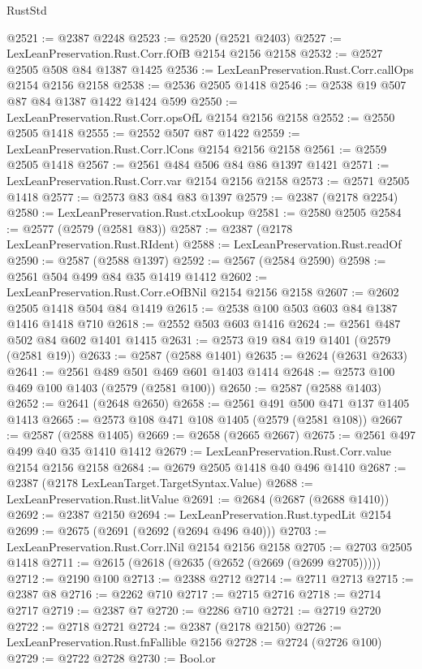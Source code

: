 \begin{lexlean}{RustStd}
\begin{coremodule}
@2521 := @2387 @2248
@2523 := @2520 (@2521 @2403)
@2527 := LexLeanPreservation.Rust.Corr.fOfB @2154 @2156 @2158
@2532 := @2527 @2505 @508 @84 @1387 @1425
@2536 := LexLeanPreservation.Rust.Corr.callOps @2154 @2156 @2158
@2538 := @2536 @2505 @1418
@2546 := @2538 @19 @507 @87 @84 @1387 @1422 @1424 @599
@2550 := LexLeanPreservation.Rust.Corr.opsOfL @2154 @2156 @2158
@2552 := @2550 @2505 @1418
@2555 := @2552 @507 @87 @1422
@2559 := LexLeanPreservation.Rust.Corr.lCons @2154 @2156 @2158
@2561 := @2559 @2505 @1418
@2567 := @2561 @484 @506 @84 @86 @1397 @1421
@2571 := LexLeanPreservation.Rust.Corr.var @2154 @2156 @2158
@2573 := @2571 @2505 @1418
@2577 := @2573 @83 @84 @83 @1397
@2579 := @2387 (@2178 @2254)
@2580 := LexLeanPreservation.Rust.ctxLookup
@2581 := @2580 @2505
@2584 := @2577 (@2579 (@2581 @83))
@2587 := @2387 (@2178 LexLeanPreservation.Rust.RIdent)
@2588 := LexLeanPreservation.Rust.readOf
@2590 := @2587 (@2588 @1397)
@2592 := @2567 (@2584 @2590)
@2598 := @2561 @504 @499 @84 @35 @1419 @1412
@2602 := LexLeanPreservation.Rust.Corr.eOfBNil @2154 @2156 @2158
@2607 := @2602 @2505 @1418 @504 @84 @1419
@2615 := @2538 @100 @503 @603 @84 @1387 @1416 @1418 @710
@2618 := @2552 @503 @603 @1416
@2624 := @2561 @487 @502 @84 @602 @1401 @1415
@2631 := @2573 @19 @84 @19 @1401 (@2579 (@2581 @19))
@2633 := @2587 (@2588 @1401)
@2635 := @2624 (@2631 @2633)
@2641 := @2561 @489 @501 @469 @601 @1403 @1414
@2648 := @2573 @100 @469 @100 @1403 (@2579 (@2581 @100))
@2650 := @2587 (@2588 @1403)
@2652 := @2641 (@2648 @2650)
@2658 := @2561 @491 @500 @471 @137 @1405 @1413
@2665 := @2573 @108 @471 @108 @1405 (@2579 (@2581 @108))
@2667 := @2587 (@2588 @1405)
@2669 := @2658 (@2665 @2667)
@2675 := @2561 @497 @499 @40 @35 @1410 @1412
@2679 := LexLeanPreservation.Rust.Corr.value @2154 @2156 @2158
@2684 := @2679 @2505 @1418 @40 @496 @1410
@2687 := @2387 (@2178 LexLeanTarget.TargetSyntax.Value)
@2688 := LexLeanPreservation.Rust.litValue
@2691 := @2684 (@2687 (@2688 @1410))
@2692 := @2387 @2150
@2694 := LexLeanPreservation.Rust.typedLit @2154
@2699 := @2675 (@2691 (@2692 (@2694 @496 @40)))
@2703 := LexLeanPreservation.Rust.Corr.lNil @2154 @2156 @2158
@2705 := @2703 @2505 @1418
@2711 := @2615 (@2618 (@2635 (@2652 (@2669 (@2699 @2705)))))
@2712 := @2190 @100
@2713 := @2388 @2712
@2714 := @2711 @2713
@2715 := @2387 @8
@2716 := @2262 @710
@2717 := @2715 @2716
@2718 := @2714 @2717
@2719 := @2387 @7
@2720 := @2286 @710
@2721 := @2719 @2720
@2722 := @2718 @2721
@2724 := @2387 (@2178 @2150)
@2726 := LexLeanPreservation.Rust.fnFallible @2156
@2728 := @2724 (@2726 @100)
@2729 := @2722 @2728
@2730 := Bool.or

\end{coremodule}
\end{lexlean}
